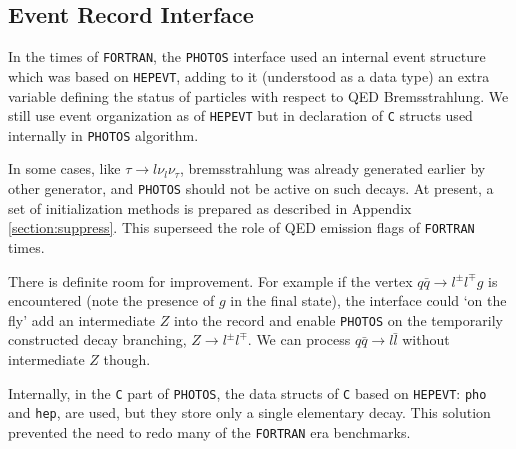 \documentclass[]{Photos_interface_design}
\begin{document}
 
\subsection{Event Record Interface}
In the times of {\tt FORTRAN}, the {\tt PHOTOS} interface used an internal event structure which was
based on {\tt HEPEVT},
adding to it (understood as a data type) an extra variable defining 
the status of particles with respect to QED Bremsstrahlung. We still use event organization as of {\tt HEPEVT} 
but in declaration of {\tt C} structs used internally in {\tt PHOTOS} algorithm.

In some cases, like
$\tau \to l \nu_l \nu_\tau$, bremsstrahlung was already generated earlier
by other generator, and {\tt PHOTOS} should not be active on such decays.
At present,  a set of initialization methods is 
prepared as described in Appendix \ref{section:suppress}. This superseed 
the role of QED emission flags of {\tt FORTRAN } times. 

There is definite room for 
improvement. For example if the vertex $q \bar q \to l^\pm l^\mp g$ is encountered
(note the presence of $g$ in the final state),
the interface could `on the fly' add an intermediate $Z$ into the record and enable {\tt PHOTOS}
on the temporarily constructed decay branching, $Z \to l^\pm l^\mp $. 
We can process $q\bar q \to l\bar l$ without intermediate $Z$ though.


Internally, in the {\tt C} part of {\tt PHOTOS}, the data
structs of {\tt C}  based on {\tt HEPEVT}: {\tt pho} and {\tt hep}, 
are used, but they store only a single elementary decay. 
This solution  prevented
the need to redo many of the {\tt FORTRAN} era benchmarks.
\end{document}
